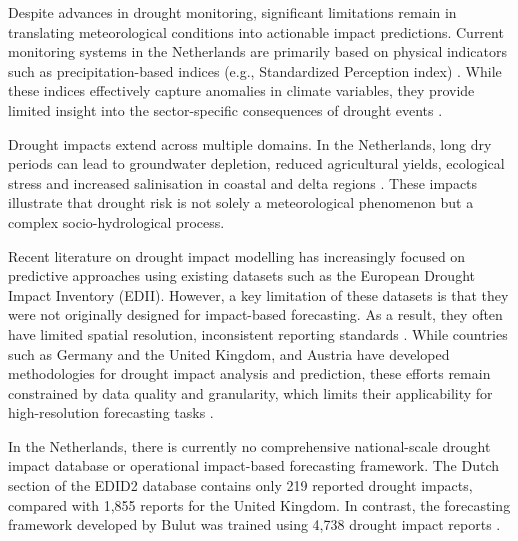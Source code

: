 Despite advances in drought monitoring, significant limitations remain in translating meteorological conditions into actionable impact predictions. Current monitoring systems in the Netherlands are primarily based on physical indicators such as precipitation-based indices (e.g., Standardized Perception index) \cite{KNMI2023}. While these indices effectively capture anomalies in climate variables, they provide limited insight into the sector-specific consequences of drought events \cite{Shyrokaya2024Advances}.

Drought impacts extend across multiple domains. In the Netherlands, long dry periods can lead to groundwater depletion, reduced agricultural yields, ecological stress and increased salinisation in coastal and delta regions \cite{KNMI2023}. These impacts illustrate that drought risk is not solely a meteorological phenomenon but a complex socio-hydrological process.

Recent literature on drought impact modelling has increasingly focused on predictive approaches using existing datasets such as the European Drought Impact Inventory (EDII). However, a key limitation of these datasets is that they were not originally designed for impact-based forecasting.  As a result, they often have limited spatial resolution, inconsistent reporting standards \cite{Shyrokaya2024Advances}. While countries such as Germany and the United Kingdom, and Austria have developed methodologies for drought impact analysis and prediction, these efforts remain constrained by data quality and granularity, which limits their applicability for high-resolution forecasting tasks \cite{Bulut2026Framework, Sutanto2019Moving}.

In the Netherlands, there is currently no comprehensive national-scale drought impact database or operational impact-based forecasting framework. The Dutch section of the EDID2 database contains only 219 reported drought impacts, compared with 1,855 reports for the United Kingdom. In contrast, the forecasting framework developed by Bulut was trained using 4,738 drought impact reports  \cite{Bulut2026Framework}. 



